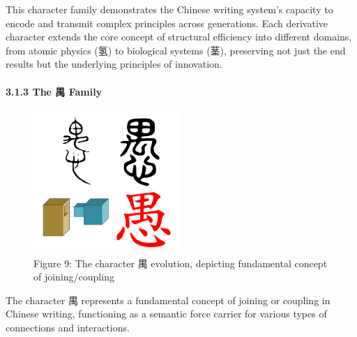 \documentclass[
  11pt,
  letterpaper,
]{article}
\begin{document}
This character family demonstrates the Chinese writing system's capacity
to encode and transmit complex principles across generations. Each
derivative character extends the core concept of structural efficiency
into different domains, from atomic physics (氢) to biological systems
(茎), preserving not just the end results but the underlying principles
of innovation.

\paragraph{3.1.3 The 禺 Family}\label{the-ux79ba-family}

\begin{figure}
\centering
\includegraphics[width=0.5\textwidth]{./images/zi_join.png} 
\caption{Figure 9: The character 禺
evolution, depicting fundamental concept of joining/coupling}
\end{figure}

The character 禺 represents a fundamental concept of joining or coupling
in Chinese writing, functioning as a semantic force carrier for various
types of connections and interactions.
\end{document}
